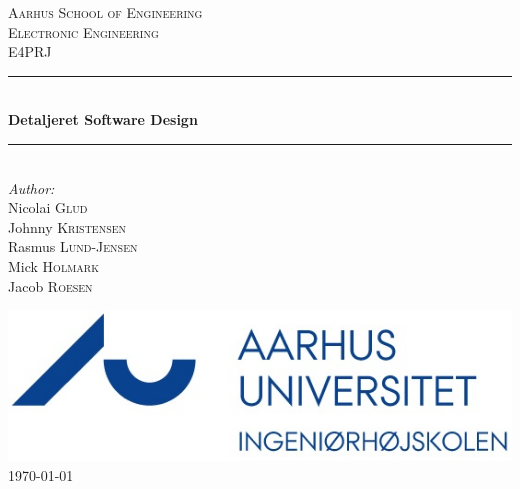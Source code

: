 \newcommand{\HRule}{\rule{\linewidth}{0.5mm}} %

\begin{center} %
 

\textsc{\LARGE Aarhus School of Engineering}\\[1.5cm] %
\textsc{\Large Electronic Engineering}\\[0.5cm] %
\textsc{\large E4PRJ}\\[0.5cm] %


\HRule \\[0.4cm]
{ \huge \bfseries Detaljeret Software Design}\\[0.4cm] %
\HRule \\[1.5cm]
 

\Large \emph{Author:}\\
Nicolai \textsc{Glud}\\ %
Johnny \textsc{Kristensen}\\
Rasmus \textsc{Lund-Jensen}\\
Mick \textsc{Holmark}\\
Jacob \textsc{Roesen}\\

 

\vfill %

\includegraphics{billeder/iha-logo}\\[1cm] %

{\large \today}\\[3cm] %
\end{center}

